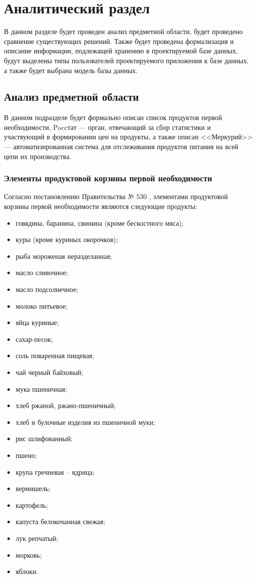 \chapter{Аналитический раздел}

В данном разделе будет проведен анализ предметной области, будет проведено сравнение существующих решений. 
Также будет проведена формализация и описание информации, подлежащей хранению в проектируемой базе данных, будут выделены типы пользователей проектируемого приложения к базе данных, а также будет выбрана модель базы данных.

\section{Анализ предметной области}

В данном подразделе будет формально описан список продуктов первой необходимости, Poccтат --- орган, отвечающий за сбор статистики и участвующий в формировании цен на продукты, а также описан <<Меркурий>> --- автоматизированная система для отслеживания продуктов питания на всей цепи их производства.

\subsection*{Элементы продуктовой корзины первой необходимости}

Согласно постановлению Правительства № 530 \cite{info_essential_goods2}, элементами продуктовой корзины первой необходимости являются следующие продукты:

\begin{itemize}[label=--]
	\item говядина, баранина, свинина (кроме бескостного мяса);
	\item куры (кроме куриных окорочков);
	\item рыба мороженая неразделанная;
	\item масло сливочное;
	\item масло подсолнечное;
	\item молоко питьевое;
	\item яйца куриные;
	\item сахар-песок;
	\item соль поваренная пищевая;
	\item чай черный байховый;
	\item мука пшеничная;
	\item хлеб ржаной, ржано-пшеничный;
	\item хлеб и булочные изделия из пшеничной муки;
	\item рис шлифованный;
	\item пшено;
	\item крупа гречневая -- ядрица;
	\item вермишель;
	\item картофель;
	\item капуста белокочанная свежая;
	\item лук репчатый;
	\item морковь;
	\item яблоки.
\end{itemize}

